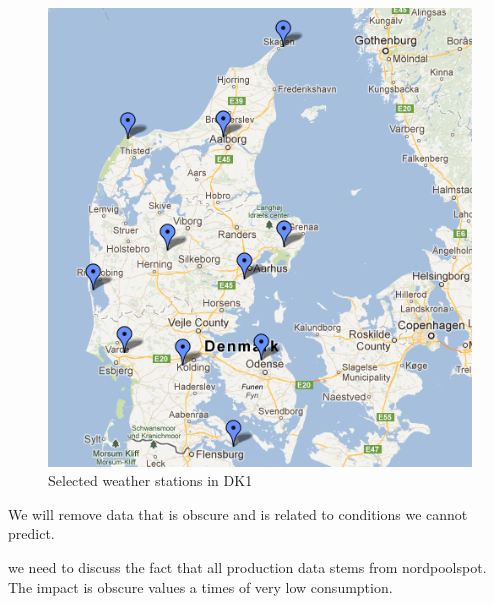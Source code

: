 \begin{figure}[H]
\centering
\includegraphics[width=0.85\linewidth,natwidth=898,natheight=587]{billeder/stations4average.png}
\caption{Selected weather stations in DK1}
\label{fig:stations4average}
\end{figure}

We will remove data that is obscure and is related to conditions we cannot predict. 

we need to discuss the fact that all production data stems from nordpoolspot. The impact is obscure values a times of very low consumption.